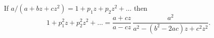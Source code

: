If $a/(a + bz + cz^{2}) = 1 + p_{1}z + p_{2}z^{2} + \dots$ then
\[
1 + p_{1}^{2}z + p_{2}^{2}z^{2} + \dots
  = \frac{a + cz}{a - cz}\, \frac{a^{2}}{a^{2} - (b^{2} - 2ac)z + c^{2}z^{2}}.
\]

